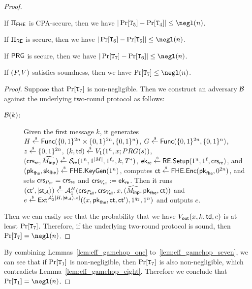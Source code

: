 \begin{proof}
\begin{lemma}\label{lem:eff_gamehop_five}
If $\Pi_{\FHE}$ is CPA-secure, then we have $|\Pr[\TT_5]-\Pr[\TT_4]|\leq \negl(\secpar)$.
\end{lemma}

\begin{lemma}\label{lem:eff_gamehop_six}
If $\Pi_{\RE}$ is secure, then we have
$|\Pr[\TT_6]-\Pr[\TT_5]|\leq \negl(\secpar)$.
\end{lemma}

\begin{lemma}\label{lem:eff_gamehop_seven}
If $\PRG$ is secure, then we have  $|\Pr[\TT_7]-\Pr[\TT_6]|\leq \negl(\secpar)$.
\end{lemma}

\begin{lemma}\label{lem:eff_gamehop_eight}
If $(\pro,\ver)$ satisfies soundness, then we have $\Pr[\TT_7]\leq \negl(\secpar)$.
\end{lemma}
\begin{proof}
Suppose that $\Pr[\TT_7]$ is non-negligible. Then we construct an adversary $\B$ against the underlying two-round protocol as follows:
\begin{description}
\item[$\B(k)$:] Given the first message $k$, it generates 
    $H\sample\func(\bit^{2\secpar}\times \bit^{2\secpar},\bit^{\secpar})$, $G\sample \func(\bit^{2\secpar},\allowbreak \bit^{\secpar})$, $z\sample \bit^{2\secpar}$,
    $(k,\td)\sample \ver_1(1^\secpar,x;PRG(s))$, $(\crs_\re,\Menc)\sample \calS_\re(1^\secpar,1^{|M|},1^{\ell_s},k,T^*)$, $\ek_\re \sample \rsetup(1^\secpar,1^\ell,\crs_\re)$,   and $(\pk_{\fhe},\sk_{\fhe})\sample \fhekeygen(1^\secpar)$,  computes  $\ct\sample \fheenc(\allowbreak \pk_{\fhe},0^{2\secpar})$,
    and sets $\crs_{\proeff}=\crs_\re$ and $\crs_{\vereff}\defeq \ek_\re$.
Then it runs $(\ct',\ket{\st_{\A}})\sample \A_1^{H}(\crs_{\proeff},\crs_{\vereff},\allowbreak x,(\Menc,\pk_{\fhe},\ct))$ and $e\sample \ext^{\A'_2[H,\ket{\st_{\A}},z]}((x,\pk_{\fhe},\ct,\ct'),1^{q_2},1^\secpar)$ and outputs $e$.
\end{description}
Then we can easily see that the probability that we have $\ver_\out(x,k,\td,e)$ is at least $\Pr[\TT_7]$.
Therefore, if the underlying two-round protocol is sound, then $\Pr[\TT_7]=\negl(\secpar)$.
\end{proof}


By combining Lemmas~\ref{lem:eff_gamehop_one} to~\ref{lem:eff_gamehop_seven}, we can see that if $\Pr[\TT_1]$ is non-negligible, then $\Pr[\TT_7]$ is also non-negligible, which contradicts Lemma~\ref{lem:eff_gamehop_eight}.
Therefore we conclude that $\Pr[\TT_1]=\negl(\secpar)$.
\end{proof}

